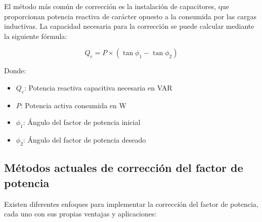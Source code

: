\documentclass{report}          %
\begin{document}
            El método más común de corrección es la instalación de capacitores, que proporcionan potencia reactiva de carácter opuesto a la consumida por las cargas inductivas. La capacidad necesaria para la corrección se puede calcular mediante la siguiente fórmula:
            
            \begin{equation}
                Q_c = P \times (\tan\phi_1 - \tan\phi_2)
            \end{equation}
            
            Donde:
            \begin{itemize}
                \item $Q_c$: Potencia reactiva capacitiva necesaria en VAR
                \item $P$: Potencia activa consumida en W
                \item $\phi_1$: Ángulo del factor de potencia inicial
                \item $\phi_2$: Ángulo del factor de potencia deseado
            \end{itemize}
    
            \subsection{Métodos actuales de corrección del factor de potencia}
                Existen diferentes enfoques para implementar la corrección del factor de potencia, cada uno con sus propias ventajas y aplicaciones:
    
\end{document}
